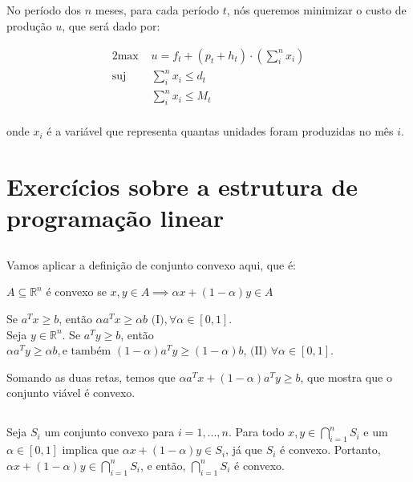 \documentclass[12pt,letterpaper]{article}
\begin{document}
	\subsection{ } No período dos $n$ meses, para cada período $t$, nós queremos minimizar o custo de produção $u$, que será dado por:
	
	 \begin{alignat*}{2}
		 \text{max  } & u =f_t+(p_t+h_t)\cdot (\sum_{i}^{n} x_i)  \\
		 \text{suj  } & \sum_{i}^{n} x_i \leq d_t\\
		              & \sum_{i}^{n} x_i \leq M_t\\
	 \end{alignat*}
	 
	 onde $x_i$ é a variável que representa quantas unidades foram produzidas no mês $i$.
	 
	 \section{Exercícios sobre a estrutura de programação linear}
	 
	 \subsection{ }
	 
	 Vamos aplicar a definição de conjunto convexo aqui, que é:
	 
	 \begin{center}
	 	$A \subseteq \mathbb{R}^n$ é convexo se $x,y \in A \implies \alpha x+(1-\alpha)y \in A$
	 \end{center}
	 
	 Se $a^Tx \geq b$, então $\alpha a^Tx \geq \alpha b \text{ (I)}, \forall \alpha \in [0,1]$.\\ Seja $y \in \mathbb{R}^n$. Se $a^Ty \geq b$, então $\alpha a^Ty \geq \alpha b, \text{e também } (1-\alpha) a^Ty \geq (1-\alpha) b\text{, (II) } \forall \alpha \in [0,1].$
	 
	 Somando as duas retas, temos que $\alpha a^Tx + (1-\alpha)a^Ty \geq b $, que mostra que o conjunto viável é convexo.
	 
	 \subsection{ }
	 
	 Seja $S_i$ um conjunto convexo para $i=1,...,n$. Para todo $x,y \in \bigcap_{i=1}^n S_i$ e um $\alpha \in [0,1]$ implica que $\alpha x + (1-\alpha)y \in S_i$, já que $S_i$ é convexo. Portanto, $\alpha x + (1-\alpha)y \in \bigcap_{i=1}^n S_i$, e então, $\bigcap_{i=1}^n S_i$ é convexo.
	 
\end{document}
